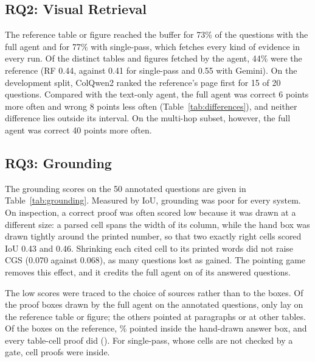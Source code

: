 \subsection{RQ2: Visual Retrieval}

The reference table or figure reached the buffer for 73\% of the questions with the
full agent and for 77\% with single-pass, which fetches every kind of evidence in every
run. Of the distinct tables and figures fetched by the agent, 44\% were the reference
(RF 0.44, against 0.41 for single-pass and 0.55 with Gemini). On the development
split, ColQwen2 ranked the reference's page first for 15 of 20 questions. Compared with the text-only agent, the full agent was correct 6 points more
often and wrong 8 points less often (Table~\ref{tab:differences}), and neither
difference lies outside its interval. On the multi-hop subset, however, the full agent
was correct 40 points more often.

\subsection{RQ3: Grounding}
\label{sec:rq3}

The grounding scores on the 50 annotated questions are given in
Table~\ref{tab:grounding}. Measured by IoU, grounding was poor for every system. On
inspection, a correct proof was often scored low because it was drawn at a different
size: a parsed cell spans the width of its column, while the hand box was drawn
tightly around the printed number, so that two exactly right cells scored IoU 0.43 and
0.46. Shrinking each cited cell to its printed words did not raise CGS (0.070 against
0.068), as many questions lost as gained. The pointing game removes this effect, and it
credits the full agent on \nPointFullAns{} of its answered questions.

\begin{table}[!htb]
\centering
\caption{Grounding on the 50 annotated questions (CGS: best IoU; Point.: pointing game,
all and answered questions) and reference attribution on all 150 questions}
\label{tab:grounding}
\footnotesize

\end{table}

The low scores were traced to the choice of sources rather than to the boxes. Of the
\nProofBoxesFull{} proof boxes drawn by the full agent on the annotated questions, only
\nProofOnRefFull{} lay on the reference table or figure; the others pointed at
paragraphs or at other tables. Of the boxes on the reference, \nProofInsideFull\% pointed
inside the hand-drawn answer box, and every table-cell proof did (\nCellsFull). For
single-pass, whose cells are not checked by a gate, \nCellsSP{} cell proofs were inside.

